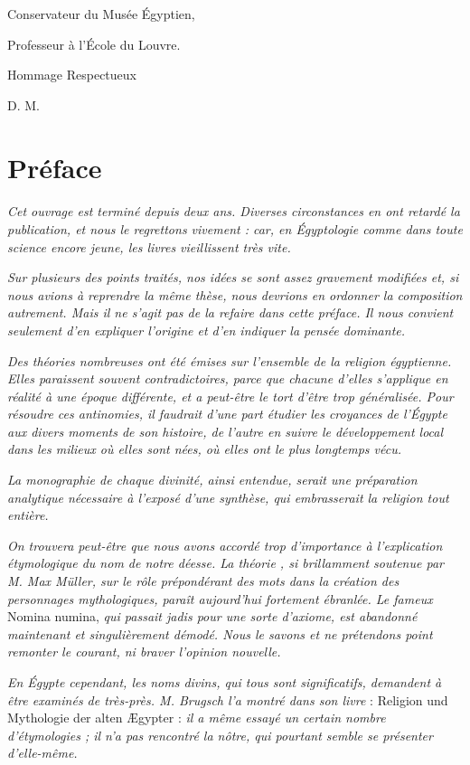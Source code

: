 \documentclass[a4paper, 11pt, oneside]{article}
\begin{document}
Conservateur du Musée Égyptien,

Professeur à l'École du Louvre.

Hommage Respectueux

D. M.
\vspace*{\fill}
\clearpage
\section*{Préface}
\paragraph{}
\emph{Cet ouvrage est terminé depuis deux ans. Diverses circonstances en ont retardé la publication, et nous le regrettons vivement : car, en Égyptologie comme dans toute science encore jeune, les livres vieillissent très vite.}

\emph{Sur plusieurs des points traités, nos idées se sont assez gravement modifiées et, si nous avions à reprendre la même thèse, nous devrions en ordonner la composition autrement. Mais il ne s'agit pas de la refaire dans cette préface. Il nous convient seulement d'en expliquer l'origine et d'en indiquer la pensée dominante.}

\emph{Des théories nombreuses ont été émises sur l'ensemble de la religion égyptienne. Elles paraissent souvent contradictoires, parce que chacune d'elles s'applique en réalité à une époque différente, et a peut-être le tort d'être trop généralisée. Pour résoudre ces antinomies, il faudrait d'une part étudier les croyances de l'Égypte aux divers moments de son histoire, de l'autre en suivre le développement local dans les milieux où elles sont nées, où elles ont le plus longtemps vécu.}

\emph{La monographie de chaque divinité, ainsi entendue, serait une préparation analytique nécessaire à l'exposé d'une synthèse, qui embrasserait la religion tout entière.}

\emph{On trouvera peut-être que nous avons accordé trop d'importance à l'explication étymologique du nom de notre déesse. La théorie , si brillamment soutenue par M. Max Müller, sur le rôle prépondérant des mots dans la création des personnages mythologiques, paraît aujourd'hui fortement ébranlée. Le fameux} Nomina numina, \emph{qui passait jadis pour une sorte d'axiome, est abandonné maintenant et singulièrement démodé. Nous le savons et ne prétendons point remonter le courant, ni braver l'opinion nouvelle.}

\emph{En Égypte cependant, les noms divins, qui tous sont significatifs, demandent à être examinés de très-près. M. Brugsch l'a montré dans son livre} : Religion und Mythologie der alten Ægypter : \emph{il a même essayé un certain nombre d'étymologies ; il n'a pas rencontré la nôtre, qui pourtant semble se présenter d'elle-même.}
\end{document}
